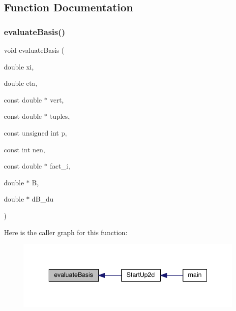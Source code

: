 \subsection{Function Documentation}
\mbox{\label{a00599_a2aba2292a481f3bb8f85213baf22686b}} 
\subsubsection{\texorpdfstring{evaluate\+Basis()}{evaluateBasis()}}
{\footnotesize\ttfamily void evaluate\+Basis (\begin{DoxyParamCaption}\item[{double}]{xi,  }\item[{double}]{eta,  }\item[{const double $\ast$}]{vert,  }\item[{const double $\ast$}]{tuples,  }\item[{const unsigned int}]{p,  }\item[{const int}]{nen,  }\item[{const double $\ast$}]{fact\+\_\+i,  }\item[{double $\ast$}]{B,  }\item[{double $\ast$}]{d\+B\+\_\+du }\end{DoxyParamCaption})}

Here is the caller graph for this function\+:\nopagebreak
\begin{figure}[H]
\begin{center}
\leavevmode
\includegraphics[width=332pt]{a00599_a2aba2292a481f3bb8f85213baf22686b_icgraph}
\end{center}
\end{figure}
\mbox{\label{a00599_a5f6af94f39daf53ff33c328e81b7aeae}} 
